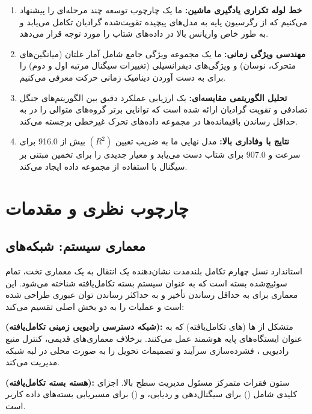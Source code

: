 \documentclass{CSICC}
\begin{document}
\begin{enumerate}
\item \textbf{خط لوله تکراری یادگیری ماشین:} ما یک چارچوب توسعه چند مرحله‌ای را پیشنهاد می‌کنیم که از رگرسیون پایه به مدل‌های پیچیده تقویت‌شده گرادیان تکامل می‌یابد و به طور خاص واریانس بالا در داده‌های شتاب را مورد توجه قرار می‌دهد.

\item \textbf{مهندسی ویژگی زمانی:} ما یک مجموعه ویژگی جامع شامل آمار غلتان (میانگین‌های متحرک، نوسان) و ویژگی‌های دیفرانسیلی (تغییرات سیگنال مرتبه اول و دوم) را برای به دست آوردن دینامیک زمانی حرکت معرفی می‌کنیم.

\item \textbf{تحلیل الگوریتمی مقایسه‌ای:} یک ارزیابی عملکرد دقیق بین الگوریتم‌های جنگل تصادفی و تقویت گرادیان ارائه شده است که توانایی برتر گروه‌های متوالی را در به حداقل رساندن باقیمانده‌ها در مجموعه داده‌های تحرک غیرخطی برجسته می‌کند.

\item \textbf{نتایج با وفاداری بالا:} مدل نهایی ما به ضریب تعیین \((R^{2})\) بیش از 916.0 برای سرعت و 907.0 برای شتاب دست می‌یابد و معیار جدیدی را برای تخمین مبتنی بر سیگنال با استفاده از مجموعه داده  ایجاد می‌کند.
\end{enumerate}
\section{چارچوب نظری و مقدمات}

\subsection{معماری سیستم: شبکه‌های }
استاندارد نسل چهارم تکامل بلندمدت  نشان‌دهنده یک انتقال به یک معماری تخت، تمام  سوئیچ‌شده بسته است که به عنوان سیستم بسته تکامل‌یافته  شناخته می‌شود. این معماری برای به حداقل رساندن تأخیر و به حداکثر رساندن توان عبوری طراحی شده است و عملیات را به دو بخش اصلی تقسیم می‌کند:

\textbf{ (شبکه دسترسی رادیویی زمینی  تکامل‌یافته):} متشکل از ها (های تکامل‌یافته) که به عنوان ایستگاه‌های پایه هوشمند عمل می‌کنند. برخلاف معماری‌های قدیمی،  کنترل منبع رادیویی ، فشرده‌سازی سرآیند و تصمیمات تحویل را به صورت محلی در لبه شبکه مدیریت می‌کند.

\textbf{ (هسته بسته تکامل‌یافته):} ستون فقرات متمرکز مسئول مدیریت سطح بالا. اجزای کلیدی شامل  () برای سیگنال‌دهی و ردیابی، و  () برای مسیریابی بسته‌های داده کاربر است.
\end{document}
